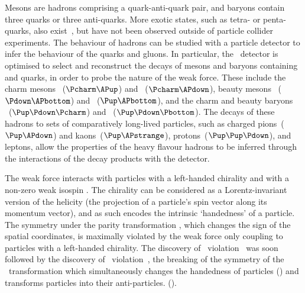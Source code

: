 Mesons are hadrons comprising a quark-anti-quark pair, and baryons contain 
three quarks or three anti-quarks.
More exotic states, such as tetra- or penta-quarks, also 
exist~\cite{Choi:2007wga,Aaij:2014jqa,Aaij:2015tga}, but have not been observed 
outside of particle collider experiments.
The behaviour of hadrons can be studied with a particle detector to infer the 
behaviour of the quarks and gluons.
In particular, the \lhcb\ detector is optimised to select and reconstruct the 
decays of mesons and baryons containing \Pcharm and \Pbottom quarks, in order 
to probe the nature of the weak force.
These include the charm mesons \PDzero~($\Pcharm\APup$) and 
\PDp~($\Pcharm\APdown$), beauty mesons \PBzero~($\Pdown\APbottom$) and 
\PBp~($\Pup\APbottom$), and the charm and beauty baryons 
\PLambdac~($\Pup\Pdown\Pcharm$) and \PLambdab~($\Pup\Pdown\Pbottom$).
The decays of these hadrons to sets of comparatively long-lived particles, such 
as charged pions~($\Pup\APdown$) and kaons~($\Pup\APstrange$), 
protons~($\Pup\Pup\Pdown$), and leptons, allow the properties of the heavy 
flavour hadrons to be inferred through the interactions of the decay products 
with the detector.\footnotemark\


The weak force interacts with particles with a left-handed chirality and with a 
non-zero weak isospin \wisospin.
The chirality can be considered as a Lorentz-invariant version of the helicity 
(the projection of a particle's spin vector along its momentum vector), and as 
such encodes the intrinsic `handedness' of a particle.
The symmetry under the parity transformation \Ptransform, which changes the 
sign of the spatial coordinates, is maximally violated by the weak force only 
coupling to particles with a left-handed chirality.
The discovery of \Ptransform\ violation~\cite{Wu:1957my} was soon followed by 
the discovery of \CP\ violation~\cite{Christenson:1964fg}, the breaking of the 
symmetry of the \CP\ transformation which simultaneously changes the handedness 
of particles (\Ptransform) and transforms particles into their anti-particles.  
(\Ctransform).

